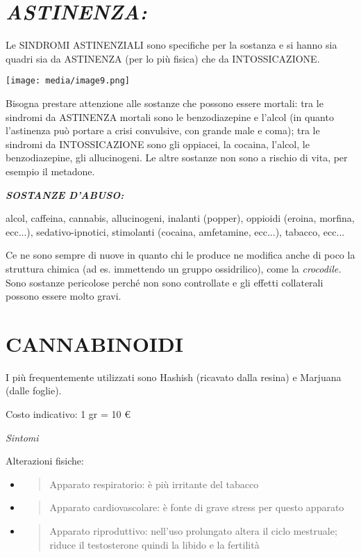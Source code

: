 \documentclass[]{article}
\newcommand{\euro}{€}
\begin{document}
\section{\texorpdfstring{\emph{ASTINENZA:}}{ASTINENZA:}}\label{astinenza}

Le SINDROMI ASTINENZIALI sono specifiche per la sostanza e si hanno sia
quadri sia da ASTINENZA (per lo più fisica) che da INTOSSICAZIONE.

\texttt{[image: media/image9.png]}

Bisogna prestare attenzione alle sostanze che possono essere mortali:
tra le sindromi da ASTINENZA mortali sono le benzodiazepine e l'alcol
(in quanto l'astinenza può portare a crisi convulsive, con grande male e
coma); tra le sindromi da INTOSSICAZIONE sono gli oppiacei, la cocaina,
l'alcol, le benzodiazepine, gli allucinogeni. Le altre sostanze non sono
a rischio di vita, per esempio il metadone.

\textbf{\emph{SOSTANZE D'ABUSO:}}

alcol, caffeina, cannabis, allucinogeni, inalanti (popper), oppioidi
(eroina, morfina, ecc...), sedativo-ipnotici, stimolanti (cocaina,
amfetamine, ecc...), tabacco, ecc...

Ce ne sono sempre di nuove in quanto chi le produce ne modifica anche di
poco la struttura chimica (ad es. immettendo un gruppo ossidrilico),
come la \emph{crocodile.} Sono sostanze pericolose perché non sono
controllate e gli effetti collaterali possono essere molto gravi.

\section{CANNABINOIDI}\label{cannabinoidi}

I più frequentemente utilizzati sono Hashish (ricavato dalla resina) e
Marjuana (dalle foglie).

Costo indicativo: 1 gr = 10 \euro{}

\emph{Sintomi}

Alterazioni fisiche:

\begin{itemize}
\item
  \begin{quote}
  Apparato respiratorio: è più irritante del tabacco
  \end{quote}
\item
  \begin{quote}
  Apparato cardiovascolare: è fonte di grave stress per questo apparato
  \end{quote}
\item
  \begin{quote}
  Apparato riproduttivo: nell'uso prolungato altera il ciclo mestruale;
  riduce il testosterone quindi la libido e la fertilità
  \end{quote}
\end{itemize}
\end{document}
